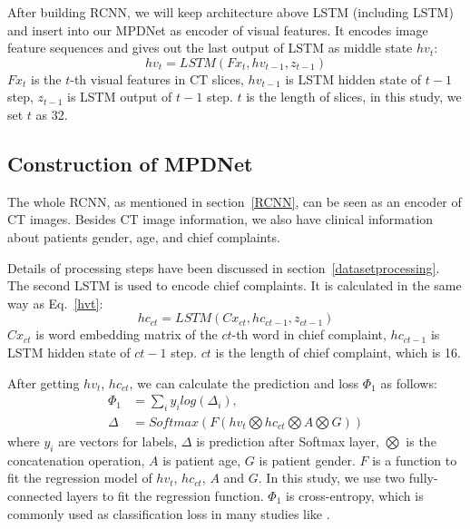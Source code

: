 \documentclass[journal]{IEEEtran}
\begin{document}
After building RCNN, we will keep architecture above LSTM (including LSTM) and insert into our MPDNet as encoder of visual features. It encodes image feature sequences and gives out the last output of LSTM as middle state $hv_t$:
\begin{equation}
hv_t = LSTM(Fx_t, hv_{t-1}, z_{t-1})
\label{hvt}
\end{equation}
$Fx_t$ is the $t$-th visual features in CT slices, $hv_{t-1}$ is LSTM hidden state of $t-1$ step, $z_{t-1}$ is LSTM output of $t-1$ step. $t$ is the length of slices, in this study, we set $t$ as 32.

\subsection{Construction of MPDNet}
\label{MMDDtxt}

The whole RCNN, as mentioned in section~\ref{RCNN}, can be seen as an encoder of CT images.
Besides CT image information, we also have clinical information about patients gender, age, and chief complaints. 

Details of processing steps have been discussed in section~\ref{datasetprocessing}. The second LSTM is used to encode chief complaints. It is calculated in the same way as Eq.~\ref{hvt}:
\begin{equation}
    hc_{ct} = LSTM(Cx_{ct}, hc_{ct-1}, z_{ct-1})
    \label{hct}
\end{equation}
$Cx_{ct}$ is word embedding matrix of the $ct$-th word in chief complaint, $hc_{ct-1}$ is LSTM hidden state of $ct-1$ step. $ct$ is the length of chief complaint, which is 16. 

After getting $hv_t$, $hc_{ct}$, we can calculate the prediction and loss $\Phi_1$ as follows:
\begin{align*}\label{classifyandloss1}
    \Phi_1 &= \sum_i{y_i log(\Delta_i)}, \\
    \Delta &= Softmax(F(hv_t \bigotimes hc_{ct} \bigotimes A \bigotimes G))
\end{align*}
where $y_i$ are vectors for labels, $\Delta$ is prediction after Softmax layer, $\bigotimes$ is the concatenation operation, $A$ is patient age, $G$ is patient gender. $F$ is a function to fit the regression model of $hv_t$, $hc_{ct}$, $A$ and $G$. In this study, we use two fully-connected layers to fit the regression function. $\Phi_1$ is cross-entropy, which is commonly used as classification loss in many studies like \cite{Zreik2018A}.
\end{document}
